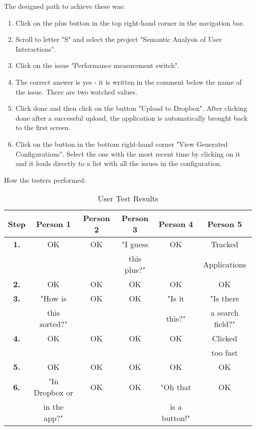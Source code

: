 The designed path to achieve these was:

\begin{enumerate}
	\item Click on the plus button in the top right-hand corner in the navigation bar.
	\item Scroll to letter "S" and select the project "Semantic Analysis of User Interactions".
	\item Click on the issue "Performance measurement switch".
	\item The correct answer is yes - it is written in the comment below the name of the issue. There are two watched values.
	\item Click done and then click on the button "Upload to Dropbox". After clicking done after a successful upload, the application is automatically brought back to the first screen.
	\item Click on the button in the bottom right-hand corner "View Generated Configurations". Select the one with the most recent time by clicking on it and it leads directly to a list with all the issues in the configuration.
\end{enumerate}

\newpage

How the testers performed:

\begin{table}[!ht]
\begin{center}
\begin{tabular}{|c|c|c|c|c|c|}
\hline
\textbf{Step} & \textbf{Person 1} & \textbf{Person 2} & \textbf{Person 3} & \textbf{Person 4} & \textbf{Person 5} \\
\hline
\textbf{1.} & OK & OK & "I guess & OK & Tracked  \\
& & & this plus?" & & Applications \\
\hline
\textbf{2.} & OK & OK & OK & OK & OK \\
\hline
\textbf{3.} & "How is  & OK & OK & "Is it & "Is there \\
& this sorted?" & & & this?" & a search field?" \\
\hline
\textbf{4.} & OK & OK & OK & OK & Clicked \\
& & & & & too fast \\
\hline
\textbf{5.} & OK & OK & OK & OK & OK \\
\hline
\textbf{6.} & "In Dropbox or & OK & OK & "Oh that & OK \\
& in the app?" & & & is a button!" & \\
\hline
\end{tabular}
\end{center}
\caption{User Test Results}
\label{tab:scenario}
\end{table}

